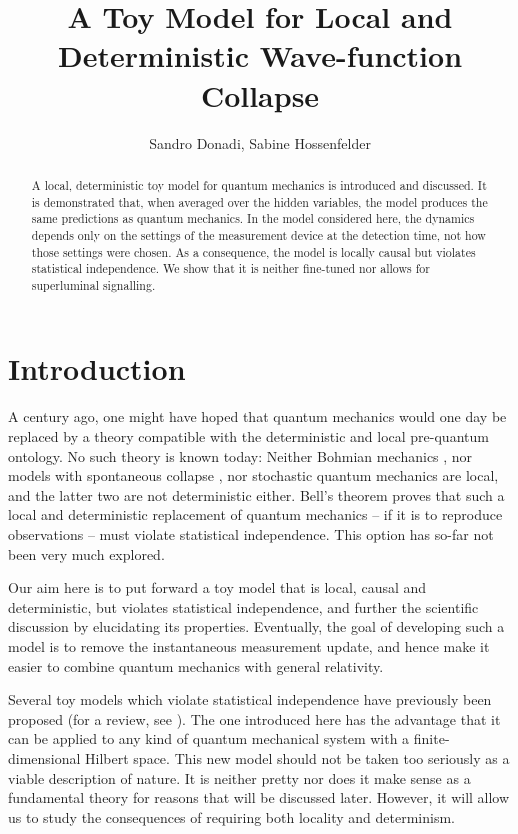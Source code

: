 \documentclass[11pt,twoside,A4]{article}
\begin{document}
\title{A Toy Model for Local and Deterministic Wave-function Collapse}
\author{Sandro Donadi, Sabine Hossenfelder}
\date{}
\maketitle
\vspace*{-1cm}


\begin{abstract}
A local, deterministic toy model for quantum mechanics is introduced and discussed. It
is demonstrated that, when averaged
over the hidden variables, the model produces the same predictions as quantum mechanics. In the model considered here, the dynamics depends only on the settings of the measurement device at the detection time, not how those settings were chosen. As a consequence, the model is locally causal but violates statistical independence. We show that it is neither fine-tuned nor allows for superluminal signalling. 
\end{abstract}

\section{Introduction} 
 
A century ago, one might have hoped that quantum mechanics would one day be replaced by a theory compatible with the deterministic and local pre-quantum ontology. No such theory is known today: Neither Bohmian mechanics \cite{Bohm}, nor models with spontaneous collapse \cite{GRW, Bassi:2003gd}, nor stochastic quantum mechanics \cite{Nelson} are local, and the latter two are not deterministic either. 
Bell's theorem \cite{Bell} proves that such a local and deterministic replacement of quantum mechanics -- if it is to reproduce observations -- must violate statistical independence. This option has so-far not been very much explored. 

Our aim here is to put forward a toy model that is local, causal and deterministic, but violates statistical independence, and further the scientific discussion by elucidating its properties. Eventually, the goal of developing such a model is to remove the instantaneous measurement update, and hence make it easier to combine quantum mechanics with general relativity.

Several toy models which violate statistical independence
have previously been proposed \cite{brans,Palmer:1995mxd,degorre,Palmer:2009mxd,Hall3,Sudarsky} (for a review, see \cite{Hall}). The one introduced here has the advantage
that it can be applied to any kind of quantum mechanical system with a finite-dimensional Hilbert space. This new model should not be taken too seriously as a viable description of nature. It is neither pretty nor does it make sense as a fundamental theory for reasons that will be discussed later. However, it will allow us to study the consequences of requiring both locality and determinism.
\end{document}
